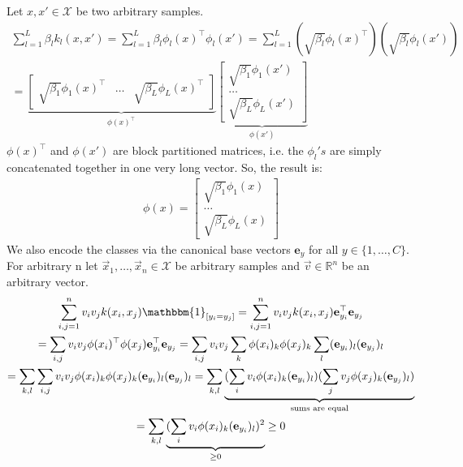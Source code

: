 \documentclass[a4paper]{article}
\newcommand{\e}{\textbf{e}}
\newcommand{\1}{\mathds{1}}
\begin{document}
Let $x,x'\in \mathcal{X}$ be two arbitrary samples.
\begin{gather*}
	\sum_{l=1}^L \beta_l k_l(x,x') 
	= 
	\sum_{l=1}^L \beta_l \phi_l(x)^\top \phi_l(x') 
	=
	\sum_{l=1}^L (\sqrt{\beta_l} \phi_l(x)^\top) (\sqrt{\beta_l} \phi_l(x'))
	\\
	=
\underbrace{
\begin{bmatrix}
	\sqrt{\beta_1} \phi_1(x)^\top	& \dots	& \sqrt{\beta_L} \phi_L(x)^\top      
\end{bmatrix}
}_{\phi(x)^\top}
\underbrace{
\begin{bmatrix}
	\sqrt{\beta_1} \phi_1(x')	\\
	\dots	\\
	\sqrt{\beta_L} \phi_L(x')      
\end{bmatrix}
}_{\phi(x')}
\end{gather*}
$\phi(x)^\top$ and $\phi(x')$ are block partitioned matrices, 
i.e. the $\phi_l's$ are simply concatenated 
together in one very long vector. So, the result is: 
\begin{gather*}
	\phi(x) = 
	\begin{bmatrix}
		\sqrt{\beta_1} \phi_1(x)	\\
		\dots	\\
		\sqrt{\beta_L} \phi_L(x)      
	\end{bmatrix}
\end{gather*}
\newpage 
{}
We also encode the classes via the canonical base vectors 
$\e_y$ for all $y\in \{1,\ldots,C\}$.
For arbitrary n let $\vec{x}_1, \ldots, \vec{x}_n \in \mathcal{X}$ be arbitrary samples 
and $\vec{v}\in\mathbb{R}^n$ be an arbitrary vector.
\begin{gather*}
	\sum_{i,j=1}^n v_i v_j k(x_i,x_j) \mathbbm{1}_{[y_i=y_j]}
	=
	\sum_{i,j=1}^n v_i v_j k(x_i,x_j) \e^\top_{y_i} \e_{y_j} 
	\\
	=
	\sum_{i,j} v_i v_j \phi(x_i)^\top \phi(x_j) \e^\top_{y_i} \e_{y_j}
	=
	\sum_{i,j} v_i v_j \sum_{k} \phi(x_i)_k \phi(x_j)_k \sum_{l}(\e_{y_i})_l (\e_{y_j})_l
	\\
	=
	\sum_{k,l} \sum_{i,j} v_i v_j \phi(x_i)_k \phi(x_j)_k (\e_{y_i})_l (\e_{y_j})_l
	=
	\sum_{k,l} \underbrace{(\sum_{i} v_i \phi(x_i)_k (\e_{y_i})_l  ) (\sum_{j}v_j \phi(x_j)_k (\e_{y_j})_l  )}_{\text{sums are equal}} 
	\\
	=
	\sum_{k,l} \underbrace{(\sum_{i} v_i \phi(x_i)_k (\e_{y_i})_l  )^2}_{\geq 0} 
	\geq 0
\end{gather*}
\end{document}
